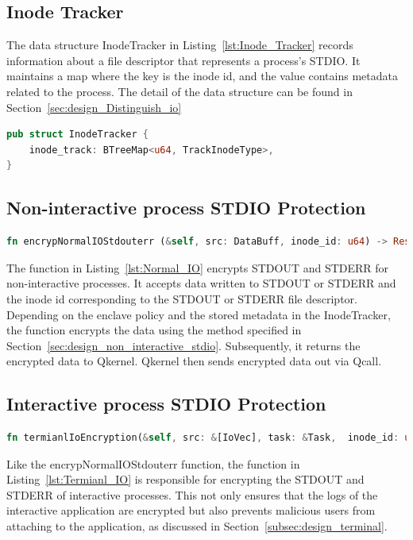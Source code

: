 \subsection{Inode Tracker}
The data structure InodeTracker in Listing~\ref{lst:Inode_Tracker} records information about a file descriptor that represents a process’s STDIO. It maintains a map where the key is the inode id, and the value contains metadata related to the process. 
The detail of the data structure can be found in Section~\ref{sec:design_Distinguish_io}


\begin{lstlisting}[language=rust, caption= API of Inode Tracker, label={lst:Inode_Tracker}]
pub struct InodeTracker {
    inode_track: BTreeMap<u64, TrackInodeType>,
} 
\end{lstlisting}

\subsection{Non-interactive process STDIO Protection}
\begin{lstlisting}[language=rust, caption= API of normal IO shield, label={lst:Normal_IO}]
fn encrypNormalIOStdouterr (&self, src: DataBuff, inode_id: u64) -> Result<DataBuff>
\end{lstlisting}
The function in Listing~\ref{lst:Normal_IO} encrypts STDOUT and STDERR for non-interactive processes. It accepts data written to STDOUT or STDERR and the inode id corresponding to the STDOUT or STDERR file descriptor. Depending on the enclave policy and the stored metadata in the InodeTracker, 
the function encrypts the data using the method specified in Section~\ref{sec:design_non_interactive_stdio}. Subsequently, it returns the encrypted data to Qkernel. Qkernel then sends encrypted data out via Qcall.



\subsection{Interactive process STDIO Protection}
\begin{lstlisting}[language=rust, caption= API of system call interceptor, label={lst:Termianl_IO}]
fn termianlIoEncryption(&self, src: &[IoVec], task: &Task,  inode_id: u64) -> Result<(Vec::<IoVec>)
\end{lstlisting}
Like the encrypNormalIOStdouterr function, the function in Listing~\ref{lst:Termianl_IO} is responsible for encrypting the STDOUT and STDERR of interactive processes. This not only ensures that the logs of the interactive application are encrypted but also prevents malicious 
users from attaching to the application, as discussed in Section~\ref{subsec:design_terminal}.

